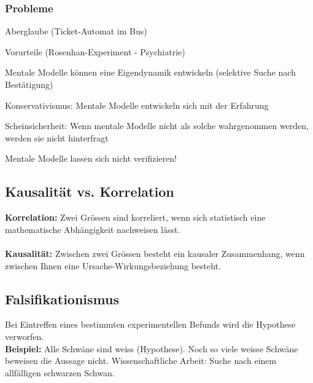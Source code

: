 \subsubsection{Probleme}
\begin{compactenum}
	\item Aberglaube (Ticket-Automat im Bus)
	\item Vorurteile (Rosenhan-Experiment - Psychiatrie)
	\item Mentale Modelle können eine Eigendynamik entwickeln (selektive Suche nach Bestätigung)
	\item Konservativismus: Mentale Modelle entwickeln sich mit der	Erfahrung
	\item Scheinsicherheit: Wenn mentale Modelle nicht als solche wahrgenommen werden, werden sie nicht hinterfragt
\end{compactenum}
Mentale Modelle lassen sich nicht verifizieren!

\subsection{Kausalität vs. Korrelation}
\begin{multicols}{2}
	\textbf{Korrelation:}
	Zwei Grössen sind korreliert, wenn sich statistisch eine mathematische Abhängigkeit nachweisen lässt.
	\ \\ \\
	\textbf{Kausalität:}
	Zwischen zwei Grössen besteht ein kausaler Zusammenhang, wenn zwischen Ihnen eine Ursache-Wirkungsbeziehung besteht.
\end{multicols}

\subsection{Falsifikationismus}
Bei Eintreffen eines bestimmten experimentellen Befunds wird die Hypothese verworfen.\\
\textbf{Beispiel:} Alle Schwäne sind weiss (Hypothese). Noch so viele weisse Schwäne beweisen die Aussage nicht. Wissenschaftliche Arbeit: Suche nach einem allfälligen schwarzen Schwan.